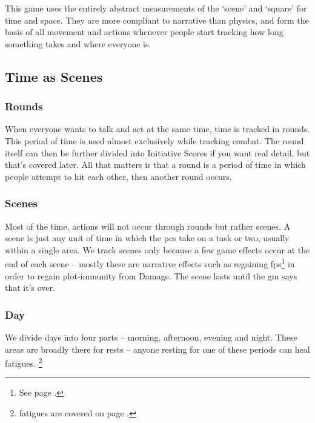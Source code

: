 \begin{multicols}{2}

\noindent
This game uses the entirely abstract measurements of the `scene' and `square' for time and space. They are more compliant to narrative than physics, and form the basis of all movement and actions whenever people start tracking how long something takes and where everyone is.

\subsection{Time as Scenes}
\label{time}

\subsubsection{Rounds}

When everyone wants to talk and act at the same time, time is tracked in \glspl{round}.
This period of time is used almost exclusively while tracking combat.
The \gls{round} itself can then be further divided into Initiative Scores if you want real detail, but that's covered later.
All that matters is that a \gls{round} is a period of time in which people attempt to hit each other, then another \gls{round} occurs.

\subsubsection{Scenes}

Most of the time, actions will not occur through \glspl{round} but rather scenes. A scene is just any unit of time in which the \glspl{pc} take on a task or two, usually within a single area. We track scenes only because a few game effects occur at the end of each scene -- mostly these are narrative effects such as regaining \glspl{fp}\footnote{See page \pageref{fate_points}.} in order to regain plot-immunity from Damage. The scene lasts until the \gls{gm} says that it's over.

\subsubsection{Day}
\label{daytimes}

We divide days into four parts -- morning, afternoon, evening and night.
These areas are broadly there for rests -- anyone resting for one of these periods can heal \glspl{fatigue}.%
\footnote{\Glspl{fatigue} are covered on page \pageref{fatigue}.}


\end{multicols}
